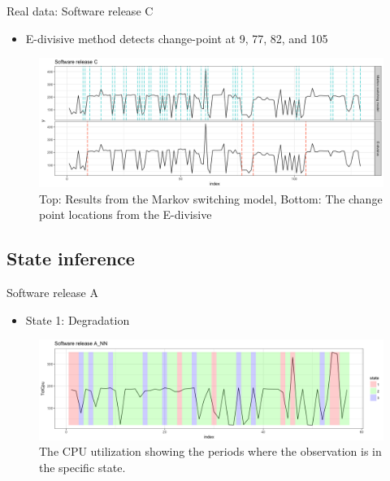\documentclass{beamer}
\begin{document}
\begin{frame}
Real data: Software release C

\begin{itemize}
	\item E-divisive method detects change-point at 9, 77, 82, and 105
\end{itemize}

\begin{figure}
	\includegraphics[width=1\linewidth]{compare_L17A}
	\caption{Top: Results from the Markov switching model, Bottom: The change point locations from the E-divisive}
\end{figure}
\end{frame}

\subsection{State inference}
\begin{frame}
Software release A
\pause

\begin{itemize}
	\item State 1: Degradation
\end{itemize}

\begin{figure}
	\includegraphics[width=1\linewidth]{L16A_NN1}
	\caption{The CPU utilization showing the periods where the observation is in the specific state.}
\end{figure}

\end{frame}
\end{document}
